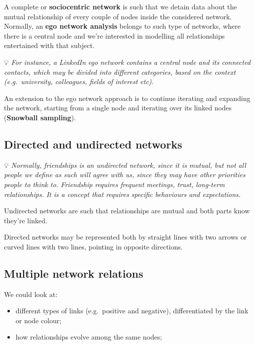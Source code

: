 \documentclass[
  notitlepage,
  onecolumn,
  openany]{book}
\providecommand{\tightlist}{%
  \setlength{\itemsep}{0pt}\setlength{\parskip}{0pt}}
\begin{document}
A complete or \textbf{sociocentric network} is such that we detain data about the mutual relationship of every couple of nodes inside the considered network. Normally, an \textbf{ego network analysis} belongs to such type of networks, where there is a central node and we're interested in modelling all relationships entertained with that subject.

💡 \emph{For instance, a LinkedIn ego network contains a central node and its connected contacts, which may be divided into different categories, based on the context (e.g.~university, colleagues, fields of interest etc).}

An extension to the ego network approach is to continue iterating and expanding the network, starting from a single node and iterating over its linked nodes (\textbf{Snowball sampling}).

\hypertarget{directed-and-undirected-networks}{%
\subsection{Directed and undirected networks}\label{directed-and-undirected-networks}}

💡 \emph{Normally, friendships is an undirected network, since it is mutual, but not all people we define as such will agree with us, since they may have other priorities people to think to.
Friendship requires frequent meetings, trust, long-term relationships. It is a concept that requires specific behaviours and expectations.}

Undirected networks are such that relationships are mutual and both parts know they're linked.

Directed networks may be represented both by straight lines with two arrows or curved lines with two lines, pointing in opposite directions.

\hypertarget{multiple-network-relations}{%
\subsection{Multiple network relations}\label{multiple-network-relations}}

We could look at:

\begin{itemize}
\tightlist
\item
  different types of links (e.g.~positive and negative), differentiated by the link or node colour;
\item
  how relationships evolve among the same nodes;
\end{itemize}
\end{document}
